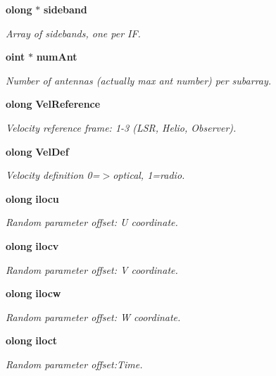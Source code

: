 \begin{CompactItemize}
{\bf olong} $\ast$ {\bf sideband}
\begin{CompactList}\small\item\em Array of sidebands, one per IF. \item\end{CompactList}\item 
{\bf oint} $\ast$ {\bf num\-Ant}
\begin{CompactList}\small\item\em Number of antennas (actually max ant number) per subarray. \item\end{CompactList}\item 
{\bf olong} {\bf Vel\-Reference}
\begin{CompactList}\small\item\em Velocity reference frame: 1-3 (LSR, Helio, Observer). \item\end{CompactList}\item 
{\bf olong} {\bf Vel\-Def}
\begin{CompactList}\small\item\em Velocity definition 0=$>$optical, 1=radio. \item\end{CompactList}\item 
{\bf olong} {\bf ilocu}
\begin{CompactList}\small\item\em Random parameter offset: U coordinate. \item\end{CompactList}\item 
{\bf olong} {\bf ilocv}
\begin{CompactList}\small\item\em Random parameter offset: V coordinate. \item\end{CompactList}\item 
{\bf olong} {\bf ilocw}
\begin{CompactList}\small\item\em Random parameter offset: W coordinate. \item\end{CompactList}\item 
{\bf olong} {\bf iloct}
\begin{CompactList}\small\item\em Random parameter offset:Time. \item\end{CompactList}\item 

\end{CompactItemize}
